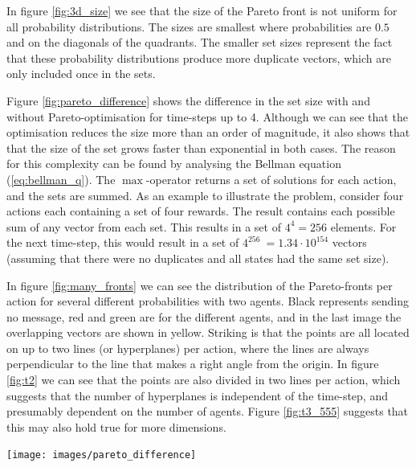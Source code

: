 \documentclass{article}
\makeatletter
\newenvironment{figurehere}
{\def\@captype{figure}}
{}
\makeatother
\begin{document}
\begin{multicols}{2}
	In figure \ref{fig:3d_size} we see that the size of the Pareto front is not
	uniform for all probability distributions. The sizes are smallest where
	probabilities are $0.5$ and on the diagonals of the quadrants. The
	smaller set sizes represent the fact that these probability distributions
	produce more duplicate vectors, which are only included once in the sets.

	Figure \ref{fig:pareto_difference} shows the difference in the set size with
	and without Pareto-optimisation for time-steps up to 4. Although we can see
	that the optimisation reduces the size more than an order of magnitude, it
	also shows that that the size of the set grows faster than exponential in
	both cases.
	The reason for this complexity can be found by analysing the Bellman
	equation (\ref{eq:bellman_q}). The $\max$-operator returns a set of
	solutions for each action, and the sets are summed. As an example to
	illustrate the problem, consider four actions each containing a set of four
	rewards. The result contains each possible sum of any vector from each set.
	This results in a set of $4^4=256$ elements. For the next time-step, this
	would result in a set of $4^{256}~=1.34\cdot 10^{154}$ vectors (assuming
	that there were no duplicates and all states had the same set size).

	In figure \ref{fig:many_fronts} we can see the distribution of the
	Pareto-fronts per action for several different probabilities with two
	agents. Black represents sending no message, red and green are for the
	different agents, and in the last image the overlapping vectors are shown in
	yellow. Striking is that the points are all located on up to two lines (or
	hyperplanes) per action, where the lines are always perpendicular to the
	line that makes a right angle from the origin. In figure \ref{fig:t2} we can
	see that the points are also divided in two lines per action, which suggests
	that the number of hyperplanes is independent of the time-step, and
	presumably dependent on the number of agents. Figure \ref{fig:t3_555}
	suggests that this may also hold true for more dimensions.

	\begin{figurehere}
		\centering
		\texttt{[image: images/pareto\_difference]}
	   \label{fig:pareto_difference}
	\end{figurehere}

	\end{multicols}
\end{document}

